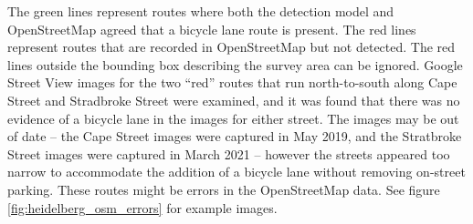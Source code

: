 \documentclass[11pt,twoside]{report}
\begin{document}
The green lines represent routes where both the detection model and OpenStreetMap agreed that a bicycle lane route is present.  The red lines represent routes that are recorded in OpenStreetMap but not detected.  The red lines outside the bounding box describing the survey area can be ignored.  Google Street View images for the two ``red'' routes that run north-to-south along Cape Street and Stradbroke Street were examined, and it was found that there was no evidence of a bicycle lane in the images for either street.  The images may be out of date -- the Cape Street images were captured in May 2019, and the Stratbroke Street images were captured in March 2021 -- however the streets appeared too narrow to accommodate the addition of a bicycle lane without removing on-street parking.  These routes might be errors in the OpenStreetMap data.  See figure \ref{fig:heidelberg_osm_errors} for example images.
\end{document}
